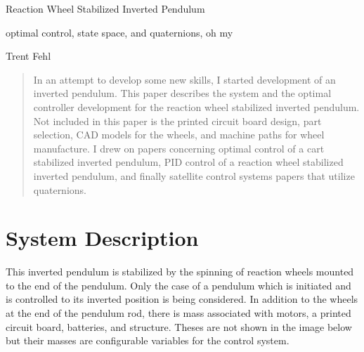 \documentclass{article}
\begin{document}
\centerline{\sc \large Reaction Wheel Stabilized Inverted Pendulum}
\vspace{.25pc}
\centerline{\sc \small optimal control, state space, and quaternions, oh my}
\vspace{.5pc}
\centerline{\sc Trent Fehl}
\vspace{1pc}

\begin{abstract}
In an attempt to develop some new skills, I started development of an 
inverted pendulum. This paper describes the system and the optimal 
controller development for the reaction wheel stabilized inverted pendulum.
Not included in this paper is the printed circuit board design, part 
selection, CAD models for the wheels, and machine paths for wheel manufacture.
I drew on papers concerning optimal control of a cart stabilized inverted 
pendulum, PID control of a reaction wheel stabilized inverted pendulum, 
and finally satellite control systems papers that utilize quaternions.
\end{abstract}

\section*{\small System Description}
This inverted pendulum is stabilized by the spinning of reaction wheels
mounted to the end of the pendulum. Only the case of a pendulum which is 
initiated and is controlled to its inverted position is being considered.
In addition to the wheels at the end of the pendulum rod, there is mass
associated with motors, a printed circuit board, batteries, and structure.
Theses are not shown in the image below but their masses are configurable 
variables for the control system.
\end{document}
